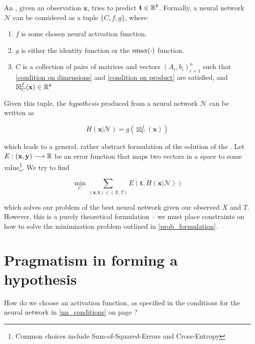 An \ann{}, given an observation $\mathbf{x}$, tries to predict $\mathbf{t}\in\mathbb{R}^k$. Formally, a neural network $\mathcal{N}$ can be considered as a tuple $\{ C, f, g \}$, where:
\label{nn_conditions}
\begin{enumerate}

\item $f$ is some chosen neural activation function.
\item $g$ is either the identity function or the $\mathrm{smax}(\cdot)$ function.
\item $C$ is a collection of pairs of matrices and vectors ${(A_i, b_i)}_{i=1}^{n}$ such that \eqref{condition on dimensions} and \eqref{condition on product} are satisfied, and $\boxtimes_{C}^{f}(\mathbf{x})\in\mathbb{R}^k$
\end{enumerate}

Given this tuple, the \emph{hypothesis} produced from a neural network $\mathcal{N}$ can be written as

\begin{equation}
\label{net_prediction}
H(\mathbf{x} | \mathcal{N}) = g(\boxtimes_{C}^{f}(\mathbf{x}))
\end{equation}

which leads to a general, rather abstract formulation of the solution of the \ann{}. Let $E : (\mathbf{x}, \mathbf{y}) \longrightarrow \mathbb{R}$ be an error function that maps two vectors in a space to some value\footnote{Common choices include Sum-of-Squared-Errors and Cross-Entropy}. We try to find

\begin{equation}
\label{prob_formulation}
\min_{C} \sum_{(\mathbf{x}, \mathbf{t}) \in (X, T)}E(\mathbf{t}, H(\mathbf{x} | \mathcal{N}))
\end{equation}

which solves our problem of the best neural network given our observed $X$ and $T$. However, this is a purely theoretical formulation -- we must place constraints on how to solve the minimization problem outlined in \eqref{prob_formulation}.


\section{Pragmatism in forming a hypothesis}

How do we choose an activation function, as specified in the conditions for the neural network in \ref{nn_conditions} on page \pageref{nn_conditions}?

